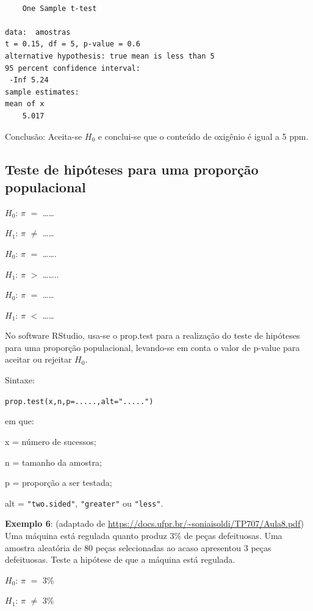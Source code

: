 \documentclass[12pt,brazil,oneside]{book}
\begin{document}
\begin{verbatim}

    One Sample t-test

data:  amostras
t = 0.15, df = 5, p-value = 0.6
alternative hypothesis: true mean is less than 5
95 percent confidence interval:
 -Inf 5.24
sample estimates:
mean of x 
    5.017 
\end{verbatim}

Conclusão: Aceita-se \(H_0\) e conclui-se que o conteúdo de oxigênio é igual a 5 ppm.

\hypertarget{teste-de-hipoteses-para-uma-proporcao-populacional}{%
\subsection{Teste de hipóteses para uma proporção populacional}\label{teste-de-hipoteses-para-uma-proporcao-populacional}}

\(H_0\): \(\pi\) \(=\) \ldots{}\ldots{}

\(H_1\): \(\pi\) \(\neq\) \ldots{}\ldots{}

\(H_0\): \(\pi\) \(=\) \ldots{}\ldots{}.

\(H_1\): \(\pi\) \(>\) \ldots{}\ldots{}..

\(H_0\): \(\pi\) \(=\) \ldots{}\ldots{}

\(H_1\): \(\pi\) \(<\) \ldots{}\ldots{}

No software RStudio, usa-se o prop.test para a realização do teste de hipóteses para uma proporção populacional, levando-se em conta o valor de p-value para aceitar ou rejeitar \(H_0\).

Sintaxe:

\texttt{prop.test(x,n,p=.....,alt=".....")}

em que:

x = número de sucessos;

n = tamanho da amostra;

p = proporção a ser testada;

alt = \texttt{"two.sided"}, \texttt{"greater"} ou \texttt{"less"}.

\textbf{Exemplo 6}: (adaptado de \url{https://docs.ufpr.br/~soniaisoldi/TP707/Aula8.pdf}) Uma máquina está regulada quanto produz 3\% de peças defeituosas. Uma amostra aleatória de 80 peças selecionadas ao acaso apresentou 3 peças defeituosas. Teste a hipótese de que a máquina está regulada.

\textbf{\(H_0\)}: \(\pi\) \(=\) 3\%

\textbf{\(H_1\)}: \(\pi\) \(\neq\) 3\%
\end{document}
